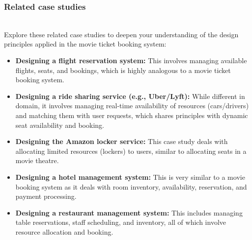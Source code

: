 \subsubsection{Related case studies}\label{WW6FX6AUh3Okj58q9lwAC}
\\
Explore these related case studies to deepen your understanding of the design principles applied in the movie ticket booking system:

\begin{itemize}
\item
\protect{}\label{YXsQSppj9jCk_7KK19XUy}
\textbf{Designing a flight reservation system:} This involves managing available flights, seats, and bookings, which is highly analogous to a movie ticket booking system.
\item
\protect{}\label{ZEGGLHSXFQy4g0a2sl2D6}
\textbf{Designing a ride sharing service (e.g., Uber/Lyft):} While different in domain, it involves managing real-time availability of resources (cars/drivers) and matching them with user requests, which shares principles with dynamic seat availability and booking.
\item
\protect{}\label{gRfn5Kg8y5-fO4jW7tZ3y}
\textbf{Designing the Amazon locker service:} This case study deals with allocating limited resources (lockers) to users, similar to allocating seats in a movie theatre.
\item
\protect{}\label{ha0upEaWZoXapk4JSWsTc}
\textbf{Designing a hotel management system:} This is very similar to a movie booking system as it deals with room inventory, availability, reservation, and payment processing.
\item
\protect{}\label{INlxWWT9W47A5I25JBvwJ}
\textbf{Designing a restaurant management system:} This includes managing table reservations, staff scheduling, and inventory, all of which involve resource allocation and booking.
\end{itemize}

